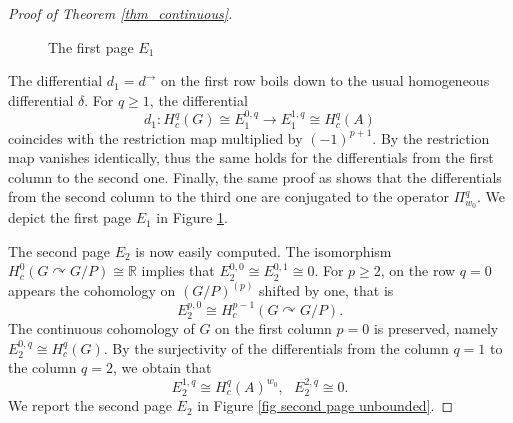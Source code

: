 \documentclass[a4paper]{amsart}
\theoremstyle{definition}
\theoremstyle{remark}
\theoremstyle{TheoremNum}
\begin{document}
\begin{proof}[Proof of Theorem \ref{thm_continuous}]
\begin{figure}[!h]
\caption{The first page $E_1$}\label{fig first page unbounded}
\end{figure}

The differential $d_1=d^\rightarrow$ on the first row boils down to the usual homogeneous differential $\delta$. For $q \geq 1$, the differential 
$$
d_1:H^q_c(G) \cong E^{0,q}_1 \longrightarrow E^{1,q}_1 \cong H^q_c(A)
$$
coincides with the restriction map multiplied by $(-1)^{p+1}$. By \cite[Corollary 3]{Wienhard} the restriction map vanishes identically, thus the same holds for the differentials from the first column to the second one. Finally, the same proof as \cite[Theorem 3]{BucSavAlt} shows that the differentials from the second column to the third one are conjugated to the operator $\Pi^q_{w_0}$. We depict the first page $E_1$ in Figure \ref{fig first page unbounded}.

The second page $E_2$ is now easily computed. The isomorphism $H^0_c(G \curvearrowright G/P) \cong \mathbb{R}$ implies that $E^{0,0}_2 \cong E^{0,1}_2 \cong 0$. For $p \geq 2$, on the row $q=0$ appears the cohomology on $(G/P)^{(p)}$ shifted by one, that is 
$$
E^{p,0}_2 \cong H^{p-1}_c(G \curvearrowright G/P). 
$$
The continuous cohomology of $G$ on the first column $p=0$ is preserved, namely $E^{0,q}_2 \cong H^q_c(G)$. By the surjectivity of the differentials from the column $q=1$ to the column $q=2$, we obtain that 
$$
E^{1,q}_2 \cong H^q_c(A)^{w_0}, \ \ \ E^{2,q}_2 \cong 0. 
$$
We report the second page $E_2$ in Figure \ref{fig second page unbounded}. 


\end{proof}
\end{document}
